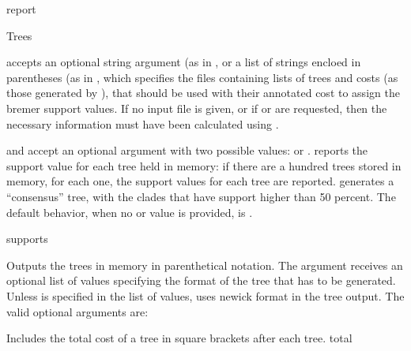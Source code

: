 \begin{command}{report}{}
\begin{arguments}
\begin{argumentgroup}{Trees}
{                 accepts an optional string argument
                (as in , 
                or a list of strings encloed in parentheses (as in
                , which specifies the files containing lists of trees and costs (as
                those generated by ), that should be used with
                their annotated cost to assign the bremer support values. 
                If no input file is given, or if  or
                 are requested,
                then the necessary information must have been calculated 
                using .
                
                 and  accept an
                optional argument with two possible values:
                 or .
                reports the support value for each tree held in memory: if there
                are a hundred trees stored in memory, for each one, the support
                values for each tree are reported. 
                generates a ``consensus'' tree, with the clades that have
                support higher than 50 percent. The default behavior, when no
                 or  value is
                provided, is .}
                {supports}

                {Outputs the trees in memory in parenthetical notation. The argument
                 receives an optional list of values
                specifying the format of the tree that has to be generated.
                Unless  is specified in the list of values, 
                 uses newick format in the tree output. The
                valid optional arguments are:  
                
                \begin{description}
                        {Includes the total cost of a tree in square brackets
                        after each tree.}
                        {total}


\end{description}}
\end{argumentgroup}
\end{arguments}
\end{command}
